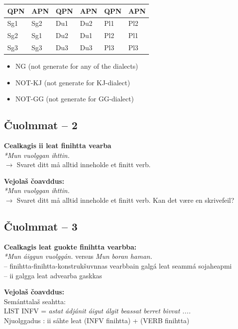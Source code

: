 \documentclass[a4paper,14pt]{article}
\begin{document}
\begin{tabular}[t]{ll|ll|ll}
QPN &APN &QPN &APN &QPN &APN \\
\hline
Sg1 &Sg2 &Du1 &Du2 &Pl1 &Pl2 \\
Sg2 &Sg1 &Du2 &Du1 &Pl2 &Pl1 \\
Sg3 &Sg3 &Du3 &Du3 &Pl3 &Pl3 \\
\hline
\end{tabular}

\begin {itemize}
\item NG (not generate for any of the dialects)
\item NOT-KJ (not generate for KJ-dialect) 
\item NOT-GG (not generate for GG-dialect)  
\end {itemize}


\subsection{Čuolmmat -- 2}
\textbf{Cealkagis ii leat finihtta vearba} \\

\textit{*Mun vuolggan ihttin.}\\
$\rightarrow$ Svaret ditt må alltid inneholde et finitt verb. 

\textbf{Vejolaš čoavddus:}\\

\textit{*Mun vuolggan ihttin.}\\
$\rightarrow$ Svaret ditt må alltid inneholde et finitt verb. Kan det være en skrivefeil?

\subsection{Čuolmmat -- 3}
\textbf{Cealkagis leat guokte finihtta vearbba:} \\
\textit{*Mun áiggun vuolggán.} versus
\textit{Mun boran haman.}\\
-- finihtta-finihtta-konstrukšuvnnas vearbbain galgá leat seammá sojaheapmi\\
-- ii galgga leat advearba gaskkas

\textbf{Vejolaš čoavddus:} \\
Semánttalaš seahtta:\\
LIST INFV = \textit{astat ádjánit áigut álgit beassat berret bivvat ....} \\
\textnormal{Njuolggadus : ii sáhte leat (INFV finihtta) + (VERB finihtta)}
\end{document}
